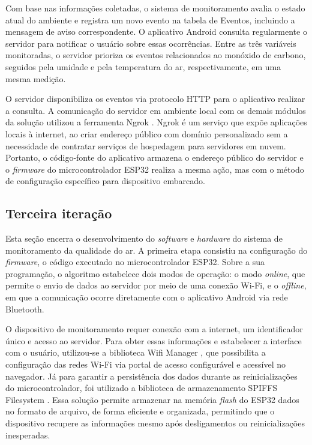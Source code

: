 Com base nas informações coletadas, o sistema de monitoramento avalia o estado atual do ambiente e registra um novo evento na 
tabela de Eventos, incluindo a mensagem de aviso correspondente. O aplicativo Android consulta regularmente o servidor para notificar 
o usuário sobre essas ocorrências. Entre as três variáveis monitoradas, o servidor prioriza os eventos relacionados ao monóxido de 
carbono, seguidos pela umidade e pela temperatura do ar, respectivamente, em uma mesma medição. 

O servidor disponibiliza os eventos via protocolo HTTP para o aplicativo realizar a consulta. A comunicação do servidor em ambiente local com os 
demais módulos da solução utilizou a ferramenta Ngrok \cite{ngrok}. Ngrok é um serviço que expõe aplicações 
locais à internet, ao criar endereço público com domínio personalizado sem a necessidade de contratar serviços de 
hospedagem para servidores em nuvem. Portanto, o código-fonte do aplicativo armazena o endereço público do servidor e o \textit{firmware} do microcontrolador 
ESP32 realiza a mesma ação, mas com o método de configuração específico para dispositivo embarcado.

\subsection{Terceira iteração}\label{ExecAtv3It}

Esta seção encerra o desenvolvimento do \textit{software} e \textit{hardware} do sistema de monitoramento da qualidade do ar. A primeira etapa consistiu na configuração 
do \textit{firmware}, o código executado no microcontrolador ESP32. Sobre a sua programação, o algoritmo estabelece dois modos de operação: o modo \textit{online}, que permite 
o envio de dados ao servidor por meio de uma conexão Wi-Fi, e o \textit{offline}, em que a comunicação ocorre diretamente com o aplicativo Android via rede Bluetooth.

O dispositivo de monitoramento requer conexão com a internet, um identificador único e acesso ao servidor. Para obter essas informações e estabelecer a interface com 
o usuário, utilizou-se a biblioteca Wifi Manager \cite{tzapu-wifimanager}, que possibilita a configuração das redes Wi-Fi via  portal de acesso configurável e acessível no navegador. Já para 
garantir a persistência dos dados durante as reinicializações do microcontrolador, foi utilizado a biblioteca de armazenamento SPIFFS Filesystem \cite{spiffs}. Essa solução permite armazenar
na memória \textit{flash} do ESP32 dados no formato de arquivo, de forma eficiente e organizada, permitindo que o dispositivo recupere as informações mesmo após desligamentos ou reinicializações inesperadas.


